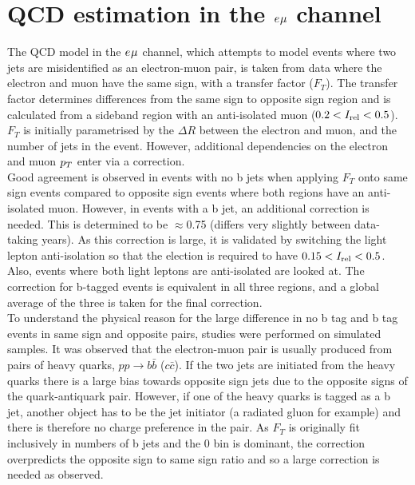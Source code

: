 \section{QCD estimation in the $e_{}\mu_{}$ channel}
\label{sec:qcd}

The \ac{QCD} model in the $e_{}\mu_{}$ channel, which attempts to model events where two jets are misidentified as an electron-muon pair, is taken from data where the electron and muon have the same sign, with a transfer factor ($F_{T}$).
The transfer factor determines differences from the same sign to opposite sign region and is calculated from a sideband region with an anti-isolated muon ($0.2 < I_{\text{rel}} < 0.5$).
$F_{T}$ is initially parametrised by the $\Delta R$ between the electron and muon, and the number of jets in the event.
However, additional dependencies on the electron and muon $p_{T}$ enter via a correction. \\

Good agreement is observed in events with no b jets when applying $F_{T}$ onto same sign events compared to opposite sign events where both regions have an anti-isolated muon. 
However, in events with a b jet, an additional correction is needed.
This is determined to be $\approx$0.75 (differs very slightly between data-taking years).
As this correction is large, it is validated by switching the light lepton anti-isolation so that the election is required to have $0.15 < I_{\text{rel}} < 0.5$.
Also, events where both light leptons are anti-isolated are looked at.
The correction for b-tagged events is equivalent in all three regions, and a global average of the three is taken for the final correction. \\

To understand the physical reason for the large difference in no b tag and b tag events in same sign and opposite pairs, studies were performed on simulated samples.
It was observed that the electron-muon pair is usually produced from pairs of heavy quarks, $pp\rightarrow b\bar{b}$ ($c\bar{c}$).
If the two jets are initiated from the heavy quarks there is a large bias towards opposite sign jets due to the opposite signs of the quark-antiquark pair.
However, if one of the heavy quarks is tagged as a b jet, another object has to be the jet initiator (a radiated gluon for example) and there is therefore no charge preference in the pair.
As $F_{T}$ is originally fit inclusively in numbers of b jets and the 0 bin is dominant, the correction overpredicts the opposite sign to same sign ratio and so a large correction is needed as observed.

